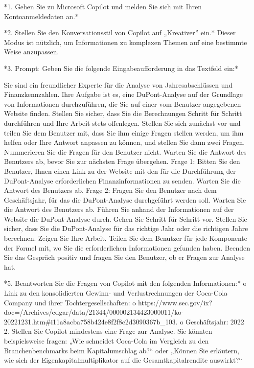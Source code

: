 \documentclass[
  ngerman,
  letterpaper,
  DIV=11]{scrreprt}
\newenvironment{Shaded}{\begin{snugshade}}{\end{snugshade}}
\newcommand{\NormalTok}[1]{\textcolor[rgb]{0.00,0.23,0.31}{#1}}
\newcommand{\SpecialStringTok}[1]{\textcolor[rgb]{0.13,0.47,0.30}{#1}}
\begin{document}
\begin{tcolorbox}
\begin{Shaded}
\begin{Highlighting}[]
\NormalTok{*1. Gehen Sie zu Microsoft Copilot und melden Sie sich mit Ihren Kontoanmeldedaten an.*}

\NormalTok{*2. Stellen Sie den Konversationsstil von Copilot auf „Kreativer” ein.* Dieser Modus ist nützlich, um Informationen zu komplexen Themen auf eine bestimmte Weise anzupassen.}

\NormalTok{*3. Prompt: Geben Sie die folgende Eingabeaufforderung in das Textfeld ein:*}

\NormalTok{Sie sind ein freundlicher Experte für die Analyse von Jahresabschlüssen und Finanzkennzahlen. Ihre Aufgabe ist es, eine DuPont{-}Analyse auf der Grundlage von Informationen durchzuführen, die Sie auf einer vom Benutzer angegebenen Website finden. Stellen Sie sicher, dass Sie die Berechnungen Schritt für Schritt durchführen und Ihre Arbeit stets offenlegen. Stellen Sie sich zunächst vor und teilen Sie dem Benutzer mit, dass Sie ihm einige Fragen stellen werden, um ihm helfen oder Ihre Antwort anpassen zu können, und stellen Sie dann zwei Fragen. Nummerieren Sie die Fragen für den Benutzer nicht. Warten Sie die Antwort des Benutzers ab, bevor Sie zur nächsten Frage übergehen. Frage 1: Bitten Sie den Benutzer, Ihnen einen Link zu der Website mit den für die Durchführung der DuPont{-}Analyse erforderlichen Finanzinformationen zu senden. Warten Sie die Antwort des Benutzers ab. Frage 2: Fragen Sie den Benutzer nach dem Geschäftsjahr, für das die DuPont{-}Analyse durchgeführt werden soll. Warten Sie die Antwort des Benutzers ab. Führen Sie anhand der Informationen auf der Website die DuPont{-}Analyse durch. Gehen Sie Schritt für Schritt vor. Stellen Sie sicher, dass Sie die DuPont{-}Analyse für das richtige Jahr oder die richtigen Jahre berechnen. Zeigen Sie Ihre Arbeit. Teilen Sie dem Benutzer für jede Komponente der Formel mit, wo Sie die erforderlichen Informationen gefunden haben. Beenden Sie das Gespräch positiv und fragen Sie den Benutzer, ob er Fragen zur Analyse hat.}

\NormalTok{*5. Beantworten Sie die Fragen von Copilot mit den folgenden Informationen:*}
\NormalTok{o   Link zu den konsolidierten Gewinn{-} und Verlustrechnungen der Coca{-}Cola Company und ihrer Tochtergesellschaften:}
\NormalTok{o   https://www.sec.gov/ix?doc=/Archives/edgar/data/21344/000002134423000011/ko{-}20221231.htm\#i11a8acba758b424e8f2f8c2d3090367b\_103.}
\NormalTok{o   Geschäftsjahr: 2022}
\SpecialStringTok{2.  }\NormalTok{Stellen Sie Copilot mindestens eine Frage zur Analyse. Sie könnten beispielsweise fragen: „Wie schneidet Coca{-}Cola im Vergleich zu den Branchenbenchmarks beim Kapitalumschlag ab?“ oder „Können Sie erläutern, wie sich der Eigenkapitalmultiplikator auf die Gesamtkapitalrendite auswirkt?“}


\end{Highlighting}
\end{Shaded}
\end{tcolorbox}
\end{document}

